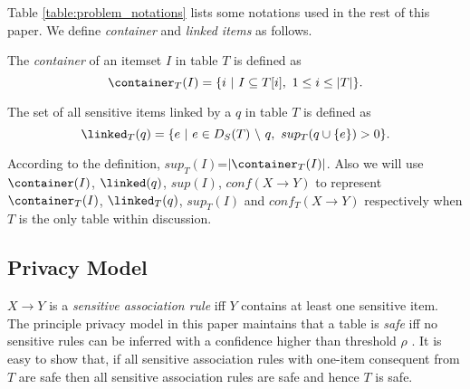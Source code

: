 {%
Table \ref{table:problem_notations} lists some notations used in the
rest of this paper. We define {\em container} and {\em linked items}
as follows.

\begin{definition}[Container]
The \emph{container} of an itemset $I$ in table $T$ is defined as
\begin{equation}
\container_T(I) = \{ i ~|~ I \subseteq T[i],~ 1 \leq i \leq |T| \}
.
\end{equation}
\end{definition}

\begin{definition}
The set of all sensitive items linked by a \qid $q$ in table $T$ is defined as
\begin{equation}
\linked_T(q) = \{ e ~|~ e \in D_S(T) ~\backslash~ q,~ sup_{T}(q\cup\{e\}) > 0 \}.
\end{equation}
\end{definition}

According to the definition, $sup_{T}(I)$=$|\container_T(I)|$.
Also we will use $\container(I)$, $\linked(q)$, $sup(I)$,
$conf(X \rightarrow Y)$ to represent $\container_T(I)$,
$\linked_T(q)$, $sup_{T}(I)$ and $conf_{T}(X \rightarrow Y)$ respectively
when $T$ is the only table within discussion.
}%

\subsection{Privacy Model}
$X \rightarrow Y$ is a {\em sensitive association rule} iff $Y$ contains
at least one sensitive item.
The principle privacy model in this paper
maintains that a table is {\em safe} iff no sensitive rules can be inferred
with a confidence higher than threshold $\rho$ \cite{Cao:2010:rho}.
It is easy to show that,
if all sensitive association rules with
one-item consequent from $T$ are safe then all sensitive association rules
are safe and hence $T$ is safe. 

